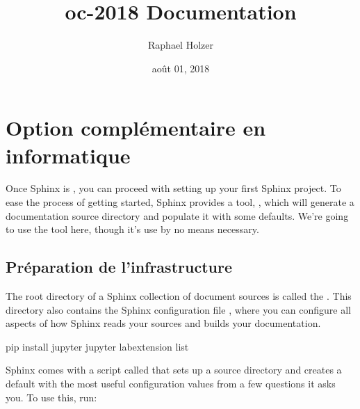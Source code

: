 \documentclass[letterpaper,10pt,french]{sphinxmanual}
\title{oc-2018 Documentation}
\date{août 01, 2018}
\author{Raphael Holzer}
\begin{document}
\maketitle
\sphinxtableofcontents
{}\label{\detokenize{index::doc}}



\chapter{Option complémentaire en informatique}
\label{\detokenize{01-intro:welcome-to-oc-2018-s-documentation}}\label{\detokenize{01-intro::doc}}\label{\detokenize{01-intro:option-complementaire-en-informatique}}
Once Sphinx is {\hyperref[\detokenize{glossary::doc}]{}}, you can proceed with
setting up your first Sphinx project. To ease the process of getting started,
Sphinx provides a tool, , which will generate a
documentation source directory and populate it with some defaults. We’re going
to use the  tool here, though it’s use by no means
necessary.


\section{Préparation de l’infrastructure}
\label{\detokenize{01-intro:preparation-de-l-infrastructure}}
The root directory of a Sphinx collection of {\hyperref[\detokenize{glossary:term-restructuredtext}]{}} document
sources is called the {\hyperref[\detokenize{glossary:term-source-directory}]{}}.  This directory also contains
the Sphinx configuration file , where you can configure all
aspects of how Sphinx reads your sources and builds your documentation.

%
\begin{sphinxVerbatim}[commandchars=\\\{\}]
\PYGZdl{} pip install jupyter
\PYGZdl{} jupyter labextension list
\end{sphinxVerbatim}

Sphinx comes with a script called  that sets up a
source directory and creates a default  with the most useful
configuration values from a few questions it asks you. To use this, run:
\end{document}
